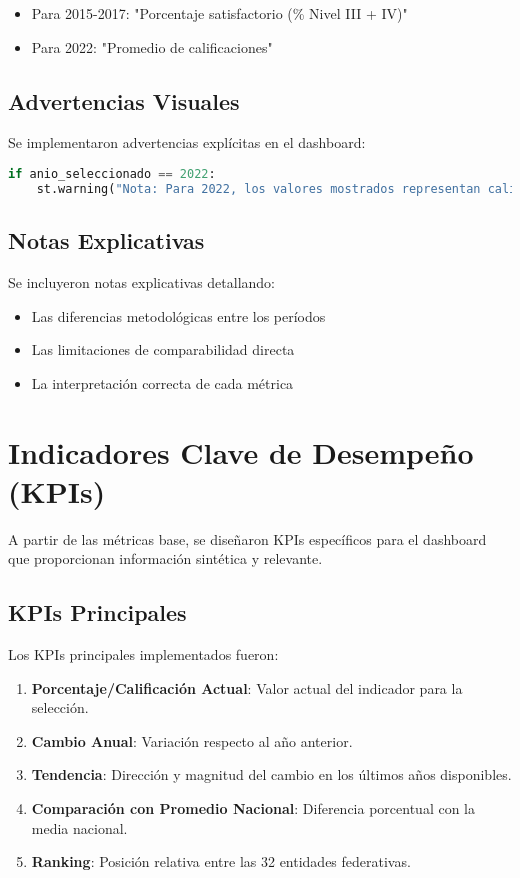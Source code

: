 \begin{itemize}
    \item Para 2015-2017: "Porcentaje satisfactorio (\% Nivel III + IV)"
    \item Para 2022: "Promedio de calificaciones"
\end{itemize}

\subsection{Advertencias Visuales}
Se implementaron advertencias explícitas en el dashboard:

\begin{lstlisting}[language=Python, caption=Implementación de advertencias]
if anio_seleccionado == 2022:
    st.warning("Nota: Para 2022, los valores mostrados representan calificaciones promedio, no porcentajes de niveles satisfactorios como en años anteriores.")
\end{lstlisting}

\subsection{Notas Explicativas}
Se incluyeron notas explicativas detallando:

\begin{itemize}
    \item Las diferencias metodológicas entre los períodos
    \item Las limitaciones de comparabilidad directa
    \item La interpretación correcta de cada métrica
\end{itemize}

\section{Indicadores Clave de Desempeño (KPIs)}
A partir de las métricas base, se diseñaron KPIs específicos para el dashboard que proporcionan información sintética y relevante.

\subsection{KPIs Principales}
Los KPIs principales implementados fueron:

\begin{enumerate}
    \item \textbf{Porcentaje/Calificación Actual}: Valor actual del indicador para la selección.
    \item \textbf{Cambio Anual}: Variación respecto al año anterior.
    \item \textbf{Tendencia}: Dirección y magnitud del cambio en los últimos años disponibles.
    \item \textbf{Comparación con Promedio Nacional}: Diferencia porcentual con la media nacional.
    \item \textbf{Ranking}: Posición relativa entre las 32 entidades federativas.
\end{enumerate}

